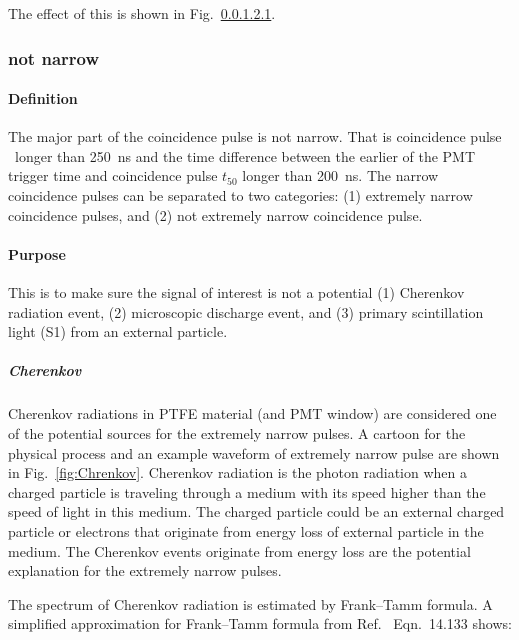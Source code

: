 The effect of this is shown in Fig.~\ref{}. 

\subsubsection{not narrow}

\paragraph{Definition}
The major part of the coincidence pulse is not narrow. That is coincidence pulse \ttwoseven\ longer than \SI{250}{\ns} and the time difference between the earlier of the PMT trigger time and coincidence pulse $t_{50}$ longer than \SI{200}{\ns}. 
The narrow coincidence pulses can be separated to two categories: (1) extremely narrow coincidence pulses, and (2) not extremely narrow coincidence pulse.

\paragraph{Purpose}
This is to make sure the signal of interest is not a potential (1) Cherenkov radiation event, (2) microscopic discharge event, and (3) primary scintillation light (S1) from an external particle. 

\subparagraph{Cherenkov} Cherenkov radiations in PTFE material (and PMT window) are considered one of the potential sources for the extremely narrow pulses. A cartoon for the physical process and an example waveform of extremely narrow pulse are shown in Fig.~\ref{fig:Chrenkov}. Cherenkov radiation is the photon radiation when a charged particle is traveling through a medium with its speed higher than the speed of light in this medium. The charged particle could be an external charged particle or electrons that originate from energy loss of external particle in the medium. The Cherenkov events originate from energy loss are the potential explanation for the extremely narrow pulses.

The spectrum of Cherenkov radiation is estimated by Frank–Tamm formula. A simplified approximation for Frank–Tamm formula from Ref.~\cite{Jackson1999} Eqn.~{14.133} shows:

